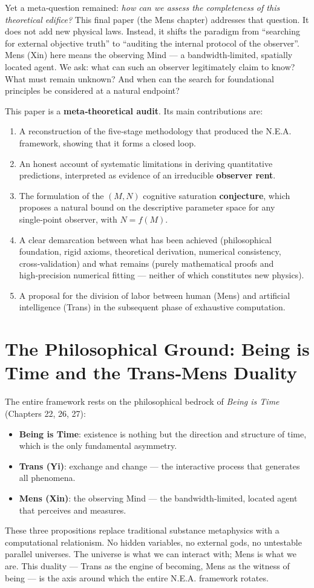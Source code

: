 \documentclass[12pt,a4paper]{article}
\begin{document}
Yet a meta‑question remained: \emph{how can we assess the completeness of this theoretical edifice?} This final paper (the Mens chapter) addresses that question. It does not add new physical laws. Instead, it shifts the paradigm from “searching for external objective truth” to “auditing the internal protocol of the observer”. Mens (Xin) here means the observing Mind — a bandwidth‑limited, spatially located agent. We ask: what can such an observer legitimately claim to know? What must remain unknown? And when can the search for foundational principles be considered at a natural endpoint?

This paper is a \textbf{meta‑theoretical audit}. Its main contributions are:
\begin{enumerate}
    \item A reconstruction of the five‑stage methodology that produced the N.E.A. framework, showing that it forms a closed loop.
    \item An honest account of systematic limitations in deriving quantitative predictions, interpreted as evidence of an irreducible \textbf{observer rent}.
    \item The formulation of the \((M,N)\) cognitive saturation \textbf{conjecture}, which proposes a natural bound on the descriptive parameter space for any single‑point observer, with \(N = f(M)\).
    \item A clear demarcation between what has been achieved (philosophical foundation, rigid axioms, theoretical derivation, numerical consistency, cross‑validation) and what remains (purely mathematical proofs and high‑precision numerical fitting — neither of which constitutes new physics).
    \item A proposal for the division of labor between human (Mens) and artificial intelligence (Trans) in the subsequent phase of exhaustive computation.
\end{enumerate}

\section{The Philosophical Ground: Being is Time and the Trans‑Mens Duality}

The entire framework rests on the philosophical bedrock of \textit{Being is Time} (Chapters 22, 26, 27):
\begin{itemize}
    \item \textbf{Being is Time}: existence is nothing but the direction and structure of time, which is the only fundamental asymmetry.
    \item \textbf{Trans (Yi)}: exchange and change — the interactive process that generates all phenomena.
    \item \textbf{Mens (Xin)}: the observing Mind — the bandwidth‑limited, located agent that perceives and measures.
\end{itemize}
These three propositions replace traditional substance metaphysics with a computational relationism. No hidden variables, no external gods, no untestable parallel universes. The universe is what we can interact with; Mens is what we are. This duality — Trans as the engine of becoming, Mens as the witness of being — is the axis around which the entire N.E.A. framework rotates.
\end{document}
